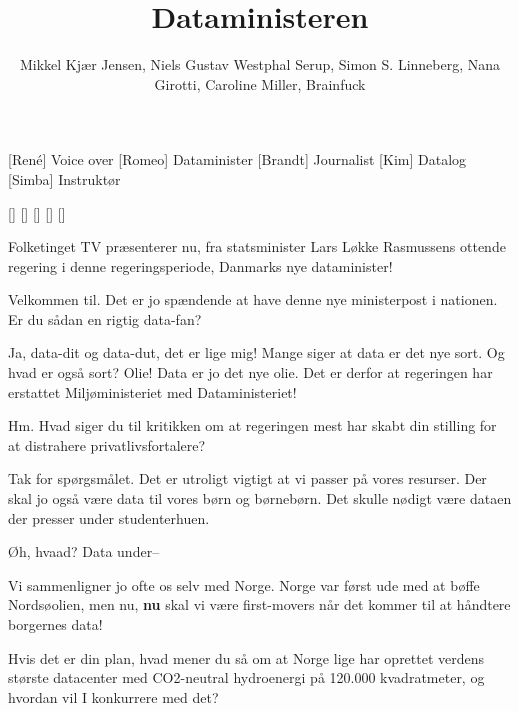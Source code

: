 \documentclass[a4paper,11pt]{article}
\title{Dataministeren}
\author{Mikkel Kjær Jensen, Niels Gustav Westphal Serup, Simon S. Linneberg,
Nana Girotti, Caroline Miller, Brainfuck}
\begin{document}
\maketitle

\begin{roles}
[René] Voice over
[Romeo] Dataminister
[Brandt] Journalist
[Kim] Datalog
[Simba] Instruktør
\end{roles}

\begin{props}
[]
[]
[]
[]
[]
\end{props}


\begin{sketch}

 Folketinget TV præsenterer nu, fra statsminister Lars Løkke Rasmussens
ottende regering i denne regeringsperiode, Danmarks nye dataminister!


 Velkommen til.  Det er jo spændende at have denne nye ministerpost i
nationen.  Er du sådan en rigtig data-fan?

  Ja, data-dit og data-dut, det er lige mig!
Mange siger at data er det nye sort.  Og hvad er også sort?  Olie!  Data er jo
det nye olie.  Det er derfor at regeringen har erstattet Miljøministeriet med
Dataministeriet!

 Hm.  Hvad siger du til kritikken om at regeringen mest har skabt din
stilling for at distrahere privatlivsfortalere?

 Tak for spørgsmålet.  Det er utroligt vigtigt at vi passer på vores
resurser.  Der skal jo også være data til vores børn og børnebørn.  Det skulle
nødigt være dataen der presser under studenterhuen.

 Øh, hvaad?  Data under--

 Vi sammenligner jo ofte os selv med Norge.  Norge var først ude med at
 bøffe Nordsøolien, men nu, 
\textbf{nu} skal vi være first-movers når det kommer til at håndtere borgernes
data!

 Hvis det er din plan, hvad mener du så om at Norge lige har oprettet
verdens største datacenter med CO2-neutral hydroenergi på 120.000 kvadratmeter,
og hvordan vil I konkurrere med det?


\end{sketch}
\end{document}
